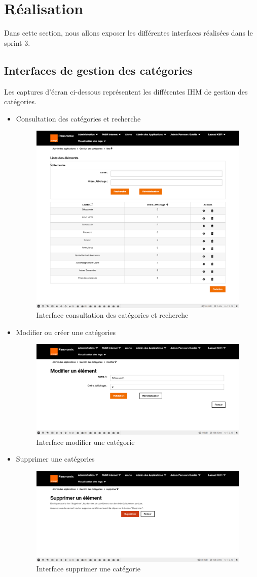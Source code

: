 \section{Réalisation}
Dans cette section, nous allons exposer les différentes interfaces réalisées dans le sprint 3.
\subsection{Interfaces de gestion des catégories}
Les captures d'écran ci-dessous représentent les différentes IHM de gestion des catégories.
\begin{itemize}
	\item Consultation des catégories et recherche
	\begin{figure}[H]
		\centering
		\includegraphics[width=0.5\linewidth]{img/screenshots/categorie/index}
		\caption[Interface consultation des catégories et recherche]{Interface consultation des catégories et recherche}
		\label{fig:index-categorie}
	\end{figure}
	\newpage
	\item Modifier ou créer une catégories
	\begin{figure}[H]
		\centering
		\includegraphics[width=0.6\linewidth]{img/screenshots/categorie/create-edit}
		\caption[Interface modifier une catégorie]{Interface modifier une catégorie}
		\label{fig:edit-categorie}
	\end{figure}

	\item Supprimer une catégories
	\begin{figure}[H]
		\centering
		\includegraphics[width=0.6\linewidth]{img/screenshots/categorie/delete}
		\caption[Interface supprimer une catégorie]{Interface supprimer une catégorie}
		\label{fig:delete-categorie}
	\end{figure}
\end{itemize}

